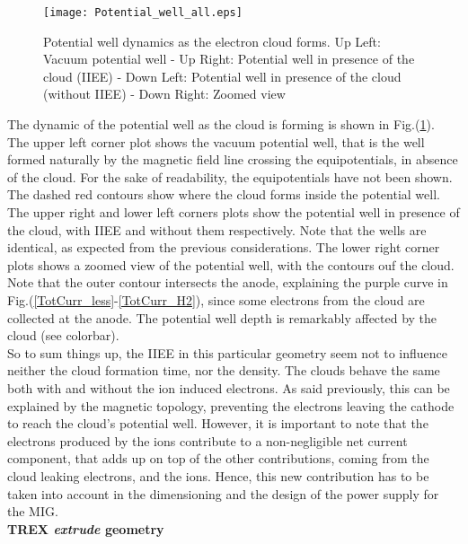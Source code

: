 \begin{figure}[h!]
\centering
	\texttt{[image: Potential\_well\_all.eps]}
	\caption{\label{pot_well_all} Potential well dynamics as the electron cloud forms. Up Left: Vacuum potential well - Up Right: Potential well in presence of the cloud (IIEE) - Down Left: Potential well in presence of the cloud (without IIEE) - Down Right: Zoomed view}
\end{figure}

\noindent The dynamic of the potential well as the cloud is forming is shown in Fig.(\ref{pot_well_all}). The upper left corner plot shows the vacuum potential well, that is the well formed naturally by the magnetic field line crossing the equipotentials, in absence of the cloud. For the sake of readability, the equipotentials have not been shown. The dashed red contours show where the cloud forms inside the potential well. The upper right and lower left corners plots show the potential well in presence of the cloud, with IIEE and without them respectively. Note that the wells are identical, as expected from the previous considerations. The lower right corner plots shows a zoomed view of the potential well, with the contours ouf the cloud. Note that the outer contour intersects the anode, explaining the purple curve in Fig.(\ref{TotCurr_less}-\ref{TotCurr_H2}), since some electrons from the cloud are collected at the anode. The potential well depth is remarkably affected by the cloud (see colorbar).\\

So to sum things up, the IIEE in this particular geometry seem not to influence neither the cloud formation time, nor the density. The clouds behave the same both with and without the ion induced electrons. As said previously, this can be explained by the magnetic topology, preventing the electrons leaving the cathode to reach the cloud's potential well. However, it is important to note that the electrons produced by the ions contribute to a non-negligible net current component, that adds up on top of the other contributions, coming from the cloud leaking electrons, and the ions. Hence, this new contribution has to be taken into account in the dimensioning and the design of the power supply for the MIG. \\
 
\textbf{TREX \emph{extrude} geometry}\\


